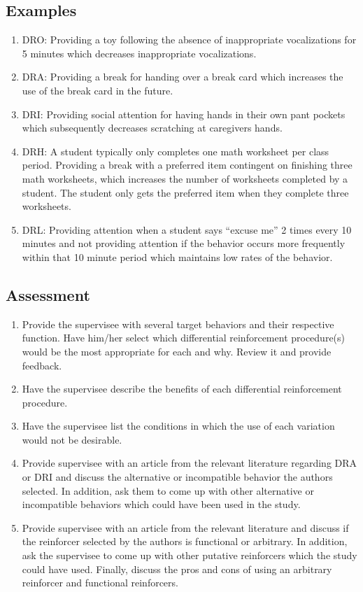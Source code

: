 \subsection{Examples}
\begin{enumerate}
\item DRO: Providing a toy following the absence of inappropriate vocalizations for 5 minutes which decreases inappropriate vocalizations. 
\item DRA: Providing a break for handing over a break card which increases the use of the break card in the future. 
\item DRI: Providing social attention for having hands in their own pant pockets which subsequently decreases scratching at caregivers hands.
\item DRH: A student typically only completes one math worksheet per class period. Providing a break with a preferred item contingent on finishing three math worksheets, which increases the number of worksheets completed by a student. The student only gets the preferred item when they complete three worksheets.
\item DRL: Providing attention when a student says ``excuse me'' 2 times every 10 minutes and not providing attention if the behavior occurs more frequently within that 10 minute period which maintains low rates of the behavior.
\end{enumerate}
%
\subsection{Assessment}
\begin{enumerate}
\item Provide the supervisee with several target behaviors and their respective function. Have him/her select which differential reinforcement procedure(s) would be the most appropriate for each and why.  Review it and provide feedback. 
\item Have the supervisee describe the benefits of each differential reinforcement procedure.
\item Have the supervisee list the conditions in which the use of each variation would not be desirable. 
\item Provide supervisee with an article from the relevant literature regarding DRA or DRI and discuss the alternative or incompatible behavior the authors selected. In addition, ask them to come up with other alternative or incompatible behaviors which could have been used in the study.
\item Provide supervisee with an article from the relevant literature and discuss if the reinforcer selected by the authors is functional or arbitrary. In addition, ask the supervisee to come up with other putative reinforcers which the study could have used. Finally, discuss the pros and cons of using an arbitrary reinforcer and functional reinforcers. 
\end{enumerate}
%
